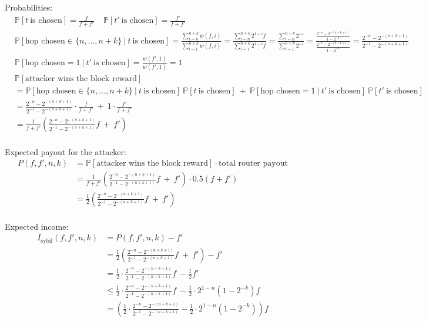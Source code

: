 \documentclass[oneside]{article}   	%
\begin{document}
Probabilities:
\begin{align*}
& \mathbb{P}\left[ t\ \text{is chosen}\right] =\frac{f}{f+f'} \ \ \ \ \ \mathbb{P}\left[ t'\ \text{is chosen}\right] =\frac{f'}{f+f'} \\
& \mathbb{P}\left[\text{hop chosen} \in \{n,...,n+k\} \ |\ t\ \text{is chosen}\right] = \frac{\sum\limits _{i=n}^{n+k} w(f,i)}{\sum\limits _{i=1}^{n+k} w(f,i)} =\frac{\sum\limits _{i=n}^{n+k} 2^{1-i} f}{\sum\limits _{i=1}^{n+k} 2^{1-i} f} =\frac{\sum\limits _{i=n}^{n+k} 2^{-i}}{\sum\limits _{i=1}^{n+k} 2^{-i}} = \frac{\frac{2^{-n}-2^{-(n+k+1)}}{1-2^{-1}}}{\frac{2^{-1}-2^{-(n+k+1)}}{1-2^{-1}}} =\frac{2^{-n}-2^{-(n+k+1)}}{2^{-1} -2^{-( n+k+1)}} \\
& \mathbb{P}\left[\text{hop chosen} =1\ |\ t'\ \text{is chosen}\right] =\frac{w( f',1)}{w( f',1)} =1 \\
& \mathbb{P}\left[\text{attacker wins the block reward}\right] \\
&= \mathbb{P}\left[\text{hop chosen} \in \{n,...,n+k\} \ |\ t\ \text{is chosen}\right] \ \mathbb{P}\left[ t\ \text{is chosen}\right]\ +\ \mathbb{P}\left[\text{hop chosen} =1\ |\ t'\ \text{is chosen}\right] \ \mathbb{P}\left[ t'\ \text{is chosen}\right] \\
&= \frac{2^{-n}-2^{-(n+k+1)}}{2^{-1}-2^{-(n+k+1)}} \cdot \frac{f}{f+f'} \ +\ 1\cdot \frac{f'}{f+f'} \\
&= \frac{1}{f+f'}\left(\frac{2^{-n}-2^{-(n+k+1)}}{2^{-1} -2^{-(n+k+1)}} f\ +\ f'\right) \\
\end{align*}

Expected payout for the attacker:
\begin{align*}
P(f,f',n,k) &= \mathbb{P}\left[\text{attacker wins the block reward}\right] \cdotp \text{total router payout} \\
        	&= \frac{1}{f+f'}\left(\frac{2^{-n}-2^{-(n+k+1)}}{2^{-1}-2^{-(n+k+1)}} f\ +\ f'\right) \cdot 0.5(f+f') \\
        	&= \frac{1}{2}\left(\frac{2^{-n} -2^{-(n+k+1)}}{2^{-1}-2^{-(n+k+1)}} f\ +\ f'\right) \\
\end{align*}

Expected income:
\begin{align*}
I_{\text{sybil}}(f,f',n,k) &= P(f,f',n,k)-f' \\
                       	&= \frac{1}{2}\left(\frac{2^{-n}-2^{-(n+k+1)}}{2^{-1}-2^{-(n+k+1)}} f\ +\ f'\right)-f'\\
                       	&= \frac{1}{2} \cdot \frac{2^{-n}-2^{-(n+k+1)}}{2^{-1}-2^{-(n+k+1)}} f\ -\frac{1}{2} f' \\
                       	&\leqslant \frac{1}{2} \cdot \frac{2^{-n}-2^{-(n+k+1)}}{2^{-1}-2^{-(n+k+1)}} f\ -\frac{1}{2} \cdot 2^{1-n}\left(1-2^{-k}\right) f \\
                       	&= \left(\frac{1}{2} \cdot \frac{2^{-n}-2^{-(n+k+1)}}{2^{-1}-2^{-(n+k+1)}}-\frac{1}{2} \cdot 2^{1-n}\left(1-2^{-k}\right)\right) f \\
\end{align*}
\end{document}
